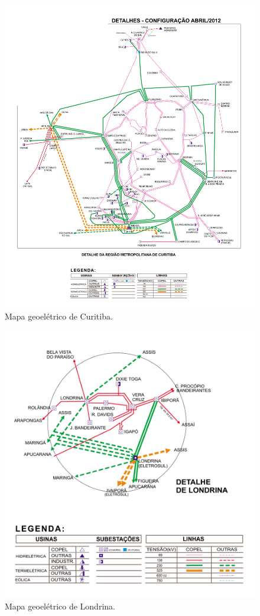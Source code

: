\documentclass[grad,numbers]{coppe}
\begin{document}
  \begin{figure}[H]
  \includegraphics[width=1\linewidth]{img/mapa_geoeletrico_curitiba} \caption{Mapa geoelétrico de Curitiba.}\label{fig:unnamed-chunk-5}
  \end{figure}
  \begin{figure}[H]
  \includegraphics[width=1\linewidth]{img/mapa_geoeletrico_londrina} \caption{Mapa geoelétrico de Londrina.}\label{fig:unnamed-chunk-6}
  \end{figure}
\end{document}
